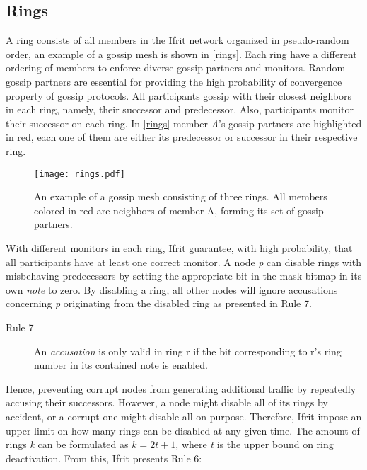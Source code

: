 \documentclass[USenglish]{uit-thesis}
\begin{document}
\subsection{Rings}
A ring consists of all members in the Ifrit network organized in pseudo-random order, an example of a gossip mesh is shown in \autoref{rings}.
Each ring have a different ordering of members to enforce diverse gossip partners and monitors.
Random gossip partners are essential for providing the high probability of convergence property of gossip protocols.
All participants gossip with their closest neighbors in each ring, namely, their successor and predecessor.
Also, participants monitor their successor on each ring.
In \autoref{rings} member \textit{A}'s gossip partners are highlighted in red, each one of them are either its predecessor or successor in their respective ring.

\begin{figure}[h]
	\centering
	\texttt{[image: rings.pdf]}
	\caption[Gossip mesh example.]{An example of a gossip mesh consisting of three rings. All members colored in red are neighbors of member A, forming its set of gossip partners.}
	\label{rings}
\end{figure}

With different monitors in each ring, Ifrit guarantee, with high probability, that all participants have at least one correct monitor.
A node \textit{p} can disable rings with misbehaving predecessors by setting the appropriate bit in the mask bitmap in its own \textit{note} to zero.
By disabling a ring, all other nodes will ignore accusations concerning \textit{p} originating from the disabled ring as presented in Rule 7.
\begin{description}
	\item[Rule 7] An \textit{accusation} is only valid in ring r if the bit corresponding to r's ring number in its contained note is enabled. 
\end{description}

Hence, preventing corrupt nodes from generating additional traffic by repeatedly accusing their successors.
However, a node might disable all of its rings by accident, or a corrupt one might disable all on purpose.
Therefore, Ifrit impose an upper limit on how many rings can be disabled at any given time.
The amount of rings \textit{k} can be formulated as $k = 2t + 1$, where \textit{t} is the upper bound on ring deactivation.
From this, Ifrit presents Rule 6:
\end{document}
